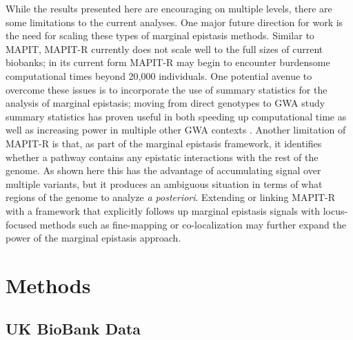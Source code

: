\documentclass[12pt,a4paper]{article}
\begin{document}
While the results presented here are encouraging on multiple levels, there are some limitations to the current analyses. One major future direction for work is the need for scaling these types of marginal epistasis methods. Similar to MAPIT, MAPIT-R currently does not scale well to the full sizes of current biobanks; in its current form MAPIT-R may begin to encounter burdensome computational times beyond 20,000 individuals. One potential avenue to overcome these issues is to incorporate the use of summary statistics for the analysis of marginal epistasis; moving from direct genotypes to GWA study summary statistics has proven useful in both speeding up computational time as well as increasing power in multiple other GWA contexts \citep{Shi2016,Johnson2018,Ray2018,Cheng2019,Turchin2019,Urbut2019}. Another limitation of MAPIT-R is that, as part of the marginal epistasis framework, it identifies whether a pathway contains any epistatic interactions with the rest of the genome. As shown here this has the advantage of accumulating signal over multiple variants, but it produces an ambiguous situation in terms of what regions of the genome to analyze \textit{a posteriori}. Extending or linking MAPIT-R with a framework that explicitly follows up marginal epistasis signals with locus-focused methods such as fine-mapping \citep{Kichaev2014,Chen2015,Benner2016} or co-localization \citep{Hormozdiari2016,Zhu2016,Wen2017,Giambartolomei2018,Wallace2020} may further expand the power of the marginal epistasis approach.  

\section{Methods}\label{InterPath-Online-Methods}

\subsection{UK BioBank Data}
\end{document}
